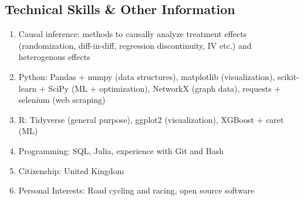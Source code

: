 \documentclass[letterpaper,11pt,oneside]{article}
\begin{document}
\subsection*{Technical Skills \& Other Information}
\begin{enumerate}[itemsep=0pt, label={\textbf{--}}, leftmargin=12pt]
    \item Causal inference: methods to causally analyze treatment effects
    (randomization, diff-in-diff, regression discontinuity, IV etc.) and heterogenous effects
    \item Python: Pandas $+$ numpy (data structures), matplotlib (visualization), scikit-learn $+$ SciPy (ML $+$ optimization), NetworkX (graph data), requests $+$ selenium (web scraping)
    \item R: Tidyverse (general purpose), ggplot2 (visualization), XGBoost $+$ caret (ML)
    \item Programming: SQL, Julia,  experience with Git and Bash
    \item Citizenship: United Kingdom %
    \item Personal Interests: Road cycling and racing, open source software
\end{enumerate}

\newpage
\end{document}
